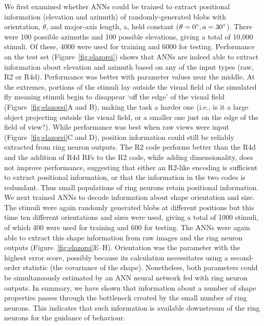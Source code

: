 \documentclass[10pt]{article}
\begin{document}
We first examined whether ANNs could be trained to extract positional information (elevation and azimuth) of randomly-generated blobs with orientation, $\theta$, and major-axis length, a, held constant ($\theta=0\degree, a = 30\degree$). There were 100 possible azimuths and 100 possible elevations, giving a total of 10,000 stimuli. Of these, 4000 were used for training and 6000 for testing. Performance on the test set (Figure~\ref{fig:elazorsi}) shows that ANNs are indeed able to extract information about elevation and azimuth based on any of the input types (raw, R2 or R4d). Performance was better with parameter values near the middle. At the extremes, portions of the stimuli lay outside the visual field of the simulated fly meaning stimuli begin to disappear ‘off the edge’ of the visual field (Figure~\ref{fig:elazorsi}A and B), making the task a harder one (i.e., is it a large object projecting outside the visual field, or a smaller one just on the edge of the field of view?). While performance was best when raw views were input (Figure~\ref{fig:elazorsi}C and D), position information could still be reliably extracted from ring neuron outputs. The R2 code performs better than the R4d and the addition of R4d RFs to the R2 code, while adding dimensionality, does not improve performance, suggesting that either an R2-like encoding is sufficient to extract positional information, or that the information in the two codes is redundant. Thus small populations of ring neurons retain positional information. 
We next trained ANNs to decode information about shape orientation and size. The stimuli were again randomly generated blobs at different positions but this time ten different orientations and sizes were used, giving a total of 1000 stimuli, of which 400 were used for training and 600 for testing. The ANNs were again able to extract this shape information from raw images and the ring neuron outputs (Figure~\ref{fig:elazorsi}E--H). Orientation was the parameter with the highest error score, possibly because its calculation necessitates using a second-order statistic (the covariance of the shape). Nonetheless, both parameters could be simultaneously estimated by an ANN neural network fed with ring neuron outputs. 
In summary, we have shown that information about a number of shape properties passes through the bottleneck created by the small number of ring neurons. This indicates that such information is available downstream of the ring neurons for the guidance of behaviour.
\end{document}
